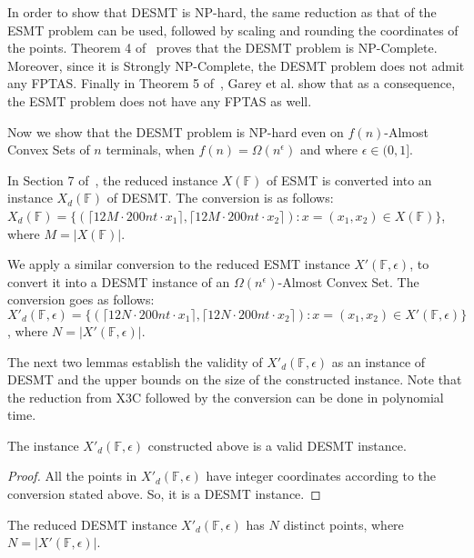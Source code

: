 In order to show that DESMT is NP-hard, the same reduction as that of the ESMT problem can be used, followed by scaling and rounding the coordinates of the points. Theorem 4 of~\cite{garey1977complexity} proves that the DESMT problem is NP-Complete. Moreover, since it is Strongly NP-Complete, the DESMT problem does not admit any FPTAS. Finally in Theorem 5 of~\cite{garey1977complexity}, Garey et al. show that as a consequence, the ESMT problem does not have any FPTAS as well.

Now we show that the DESMT problem is NP-hard even on $f(n)$-Almost Convex Sets of $n$ terminals, when $f(n) = \Omega (n^\epsilon)$ and where $\epsilon \in (0,1]$.

In Section 7 of~\cite{garey1977complexity}, the reduced instance $X(\mathbb{F})$ of ESMT is converted into an instance $X_{d}(\mathbb{F})$ of DESMT. The conversion is as follows:\\
$X_{d}(\mathbb{F}) = \{(\lceil 12M\cdot 200nt\cdot x_1\rceil, \lceil 12M\cdot 200nt\cdot x_2\rceil): x=(x_1,x_2)\in X(\mathbb{F})\}$, where $M = |X(\mathbb{F})|$.

We apply a similar conversion to the reduced ESMT instance $X'(\mathbb{F},\epsilon)$, to convert it into a DESMT instance of an $\Omega(n^\epsilon)$-Almost Convex Set. The conversion goes as follows:\\
$X'_{d}(\mathbb{F},\epsilon) = \{(\lceil 12N\cdot 200nt\cdot x_1\rceil, \lceil 12N\cdot 200nt\cdot x_2\rceil): x=(x_1,x_2)\in X'(\mathbb{F},\epsilon)\}$, where $N = |X'(\mathbb{F},\epsilon)|$.

The next two lemmas establish the validity of $X'_{d}(\mathbb{F},\epsilon)$ as an instance of DESMT and the upper bounds on the size of the constructed instance. Note that the reduction from X3C followed by the conversion can be done in polynomial time.
\begin{lemma}\label{lem:valid_desmt}
    The instance $X'_{d}(\mathbb{F},\epsilon)$ constructed above is a valid DESMT instance.
\end{lemma}

\begin{proof}
    All the points in $X'_{d}(\mathbb{F},\epsilon)$ have integer coordinates according to the conversion stated above. So, it is a DESMT instance.
\end{proof}

\begin{lemma}\label{lem:numpts_same}
    The reduced DESMT instance $X'_{d}(\mathbb{F},\epsilon)$ has $N$ distinct points, where $N = |X'(\mathbb{F},\epsilon)|$.
\end{lemma}

